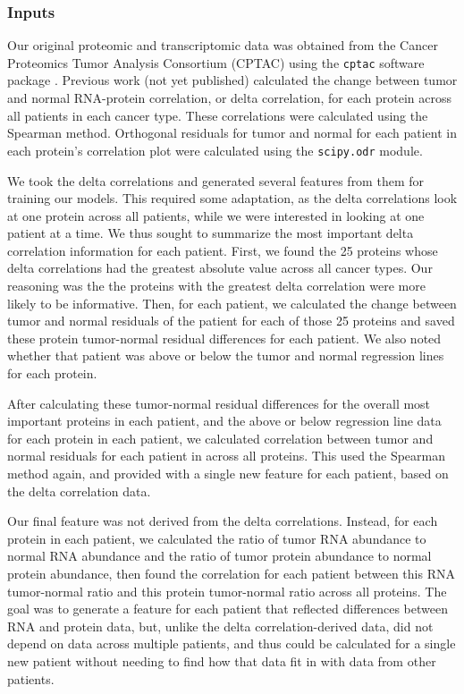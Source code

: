 \documentclass{article}
\begin{document}
\subsubsection{Inputs}

Our original proteomic and transcriptomic data was obtained from the Cancer Proteomics Tumor Analysis Consortium (CPTAC) \cite{rodriguez_next_2021} using the \texttt{cptac} software package \cite{lindgren_simplified_2021}. Previous work (not yet published) calculated the change between tumor and normal RNA-protein correlation, or delta correlation, for each protein across all patients in each cancer type. These correlations were calculated using the Spearman method. Orthogonal residuals for tumor and normal for each patient in each protein's correlation plot were calculated using the \texttt{scipy.odr} module.

We took the delta correlations and generated several features from them for training our models. This required some adaptation, as the delta correlations look at one protein across all patients, while we were interested in looking at one patient at a time. We thus sought to summarize the most important delta correlation information for each patient. First, we found the 25 proteins whose delta correlations had the greatest absolute value across all cancer types. Our reasoning was the the proteins with the greatest delta correlation were more likely to be informative. Then, for each patient, we calculated the change between tumor and normal residuals of the patient for each of those 25 proteins and saved these protein tumor-normal residual differences for each patient. We also noted whether that patient was above or below the tumor and normal regression lines for each protein.

After calculating these tumor-normal residual differences for the overall most important proteins in each patient, and the above or below regression line data for each protein in each patient, we calculated correlation between tumor and normal residuals for each patient in across all proteins. This used the Spearman method again, and provided with a single new feature for each patient, based on the delta correlation data.

Our final feature was not derived from the delta correlations. Instead, for each protein in each patient, we calculated the ratio of tumor RNA abundance to normal RNA abundance and the ratio of tumor protein abundance to normal protein abundance, then found the correlation for each patient between this RNA tumor-normal ratio and this protein tumor-normal ratio across all proteins. The goal was to generate a feature for each patient that reflected differences between RNA and protein data, but, unlike the delta correlation-derived data, did not depend on data across multiple patients, and thus could be calculated for a single new patient without needing to find how that data fit in with data from other patients.
\end{document}
